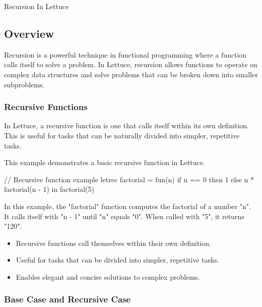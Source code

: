 \begin{notes}{Recursion In Lettuce}
    \subsection*{Overview}

    Recursion is a powerful technique in functional programming where a function calls itself to solve a problem. In Lettuce, recursion allows functions to operate on complex data structures and solve problems that can be broken down into smaller subproblems.
    
    \subsubsection*{Recursive Functions}
    
    In Lettuce, a recursive function is one that calls itself within its own definition. This is useful for tasks that can be naturally divided into simpler, repetitive tasks.
    
    \begin{highlight}
    
        This example demonstrates a basic recursive function in Lettuce.
    
    \begin{code}[Lettuce]
    // Recursive function example
    letrec factorial = fun(n) {
        if n == 0 then 1 else n * factorial(n - 1)
    } in
    factorial(5)
    \end{code}
    
        In this example, the "factorial" function computes the factorial of a number "n". It calls itself with "n - 1" until "n" equals "0". When called with "5", it returns "120".
    
        \begin{itemize}
            \item Recursive functions call themselves within their own definition.
            \item Useful for tasks that can be divided into simpler, repetitive tasks.
            \item Enables elegant and concise solutions to complex problems.
        \end{itemize}
    
    \end{highlight}
    
    \subsubsection*{Base Case and Recursive Case}
    

\end{notes}
